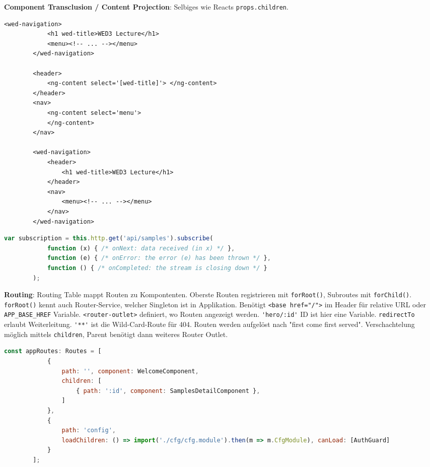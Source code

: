 \documentclass[10pt,landscape]{article}
\begin{document}
\begin{multicols}{2}
        \textbf{Component Transclusion / Content Projection}: Selbiges wie Reacts \lstinline{props.children}.

        \begin{lstlisting}[belowskip=-0.8 \baselineskip]
        <wed-navigation>
            <h1 wed-title>WED3 Lecture</h1>
            <menu><!-- ... --></menu>
        </wed-navigation>

        <header>
            <ng-content select='[wed-title]'> </ng-content>
        </header>
        <nav>
            <ng-content select='menu'>
            </ng-content>
        </nav>

        <wed-navigation>
            <header>
                <h1 wed-title>WED3 Lecture</h1>
            </header>
            <nav>
                <menu><!-- ... --></menu>
            </nav>
        </wed-navigation>
        \end{lstlisting}

        \begin{lstlisting}[language=JavaScript]
        var subscription = this.http.get('api/samples').subscribe(
            function (x) { /* onNext: data received (in x) */ },
            function (e) { /* onError: the error (e) has been thrown */ },
            function () { /* onCompleted: the stream is closing down */ }
        );
        \end{lstlisting}

        \textbf{Routing}: Routing Table mappt Routen zu Kompontenten.
        Oberste Routen registrieren mit \lstinline{forRoot()}, Subroutes mit \lstinline{forChild()}.
        \lstinline{forRoot()} kennt auch Router-Service, welcher Singleton ist in Applikation.
        Benötigt \lstinline{<base href="/">} im Header für relative URL oder \lstinline{APP_BASE_HREF} Variable.
        \lstinline{<router-outlet>} definiert, wo Routen angezeigt werden.
        \lstinline{'hero/:id'} ID ist hier eine Variable.
        \lstinline{redirectTo} erlaubt Weiterleitung.
        \lstinline{'**'} ist die Wild-Card-Route für 404.
        Routen werden aufgelöst nach "first come first served".
        Verschachtelung möglich mittels \lstinline{children}, Parent benötigt dann weiteres Router Outlet.

        \begin{lstlisting}[language=JavaScript]
        const appRoutes: Routes = [
            {
                path: '', component: WelcomeComponent,
                children: [
                    { path: ':id', component: SamplesDetailComponent },
                ]
            },
            {
                path: 'config',
                loadChildren: () => import('./cfg/cfg.module').then(m => m.CfgModule), canLoad: [AuthGuard]
            }
        ];


\end{lstlisting}
\end{multicols}
\end{document}
